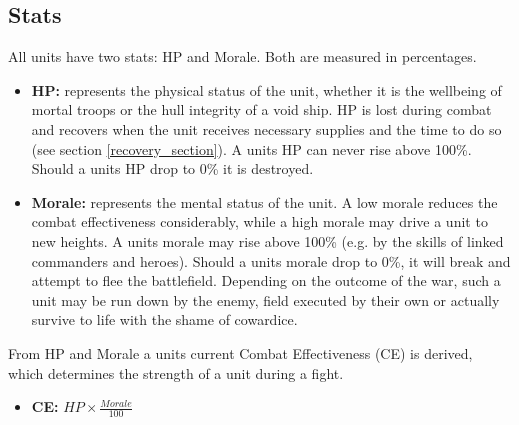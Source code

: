 \subsection{Stats}
All units have two stats: HP and Morale. Both are measured in percentages.
\begin{itemize}
	\item \textbf{HP:} represents the physical status of the unit, whether it is the wellbeing of mortal troops or the hull integrity of a void ship. HP is lost during combat and recovers when the unit receives necessary supplies and the time to do so (see section \ref{recovery_section}). A units HP can never rise above 100\%. Should a units HP drop to 0\% it is destroyed.
	\item \textbf{Morale:} represents the mental status of the unit. A low morale reduces the combat effectiveness considerably, while a high morale may drive a unit to new heights. A units morale may rise above 100\% (e.g. by the skills of linked commanders and heroes). Should a units morale drop to 0\%, it will break and attempt to flee the battlefield. Depending on the outcome of the war, such a unit may be run down by the enemy, field executed by their own or actually survive to life with the shame of cowardice. 
\end{itemize}
From HP and Morale a units current Combat Effectiveness	(CE) is derived, which determines the strength of a unit during a fight.
\begin{itemize}
	\item \textbf{CE:} $HP \times \frac{Morale}{100}$
\end{itemize}

